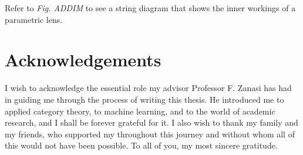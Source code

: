 \documentclass[11pt,a4paper,openright,twoside]{report}
\theoremstyle{plain}
\theoremstyle{definition}
\begin{document}
Refer to \textit{Fig. ADDIM} to see a string diagram that shows the inner workings of a parametric lens.












\chapter*{Acknowledgements}

\thispagestyle{empty}

I wish to acknowledge the essential role my advisor Professor F. Zanasi has had in guiding me through the process of writing this thesis. He introduced me to applied category theory, to machine learning, and to the world of academic research, and I shall be forever grateful for it. I also wish to thank my family and my friends, who supported my throughout this journey and without whom all of this would not have been possible. To all of you, my most sincere gratitude.
\end{document}
